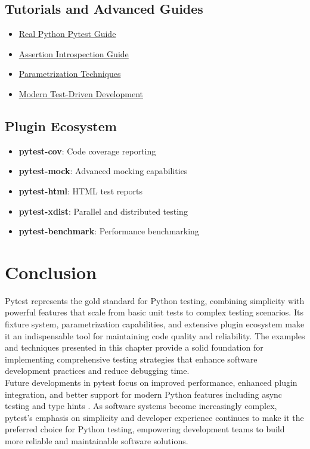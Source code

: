 \subsection{Tutorials and Advanced Guides}
\begin{itemize}
	\item \href{https://realpython.com/pytest-python-testing/}{Real Python Pytest Guide} \cite{RealPython:2024}
	\item \href{https://pytest.org/en/stable/how-to/capture-assert.html}{Assertion Introspection Guide}
	\item \href{https://docs.pytest.org/en/stable/how-to/parametrize.html}{Parametrization Techniques} \cite{PytestDocs:2024}
	\item \href{https://testdriven.io/blog/modern-tdd/}{Modern Test-Driven Development}
\end{itemize}

\subsection{Plugin Ecosystem}
\begin{itemize}
	\item \textbf{pytest-cov}: Code coverage reporting
	\item \textbf{pytest-mock}: Advanced mocking capabilities
	\item \textbf{pytest-html}: HTML test reports
	\item \textbf{pytest-xdist}: Parallel and distributed testing
	\item \textbf{pytest-benchmark}: Performance benchmarking
\end{itemize}

\section{Conclusion}
\label{sec:conclusion}

Pytest represents the gold standard for Python testing, combining simplicity with powerful features that scale from basic unit tests to complex testing scenarios. Its fixture system, parametrization capabilities, and extensive plugin ecosystem make it an indispensable tool for maintaining code quality and reliability. The examples and techniques presented in this chapter provide a solid foundation for implementing comprehensive testing strategies that enhance software development practices and reduce debugging time.\\

Future developments in pytest focus on improved performance, enhanced plugin integration, and better support for modern Python features including async testing and type hints \cite{RealPython:2024}. As software systems become increasingly complex, pytest's emphasis on simplicity and developer experience continues to make it the preferred choice for Python testing, empowering development teams to build more reliable and maintainable software solutions.